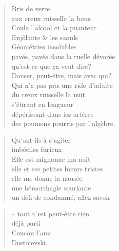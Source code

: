\newpage
{}
  \begin{verse}
    Bris de verre\\
    aux creux ruisselle la boue\\
    Coule l’alcool et la puanteur\\
    Enjôlante \& les saouls\\
    Géométries insolubles\\
    pavés, pavés dans la ruelle dévorée\\
    qu’est-ce que ça veut dire?\\
    Danser, peut-être, mais avec qui?\\
    Qui n’a pas pris une ride d’adulte\\
    du creux ruisselle la nuit\\
    s’étirant en longueur\\
    dépérissant dans les artères\\
    des poumons pourris par l’algèbre.
  \end{verse}
  \begin{verse}
    Qu’ont-ils à s’agiter\\
    imbéciles furieux\\
    Elle est mignonne ma nuit\\
    elle et ses petites lueurs tristes\\
    elle me donne la nausée\\
    une hémorrhagie souriante\\
    un défi de condamné, allez savoir
  \end{verse}
  \begin{verse}
    -- tout n’est peut-être rien\\
    déjà parti\\
    Coucou l’ami\\
    Dostoievski.
  \end{verse}

